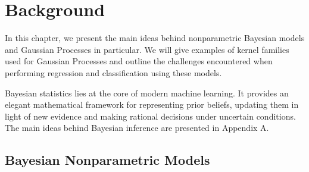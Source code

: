\documentclass[a4paper,12pt ]{report}
\begin{document}




\clearpage



\chapter{Background}

In this chapter, we present the main ideas behind nonparametric Bayesian models and Gaussian Processes in particular. We will give examples of kernel families used for Gaussian Processes and outline the challenges encountered when performing regression and classification using these models.

Bayesian statistics lies at the core of modern machine learning. It provides an elegant mathematical framework for representing prior beliefs, updating them in light of new evidence and making rational decisions under uncertain conditions. The main ideas behind Bayesian inference are presented in Appendix A.

\section{Bayesian Nonparametric Models}
\end{document}
